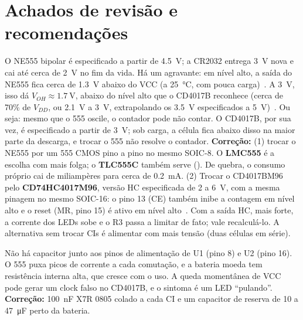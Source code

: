 \documentclass[11pt,a4paper]{article}
\begin{document}
\section{Achados de revisão e recomendações}\label{sec:achados}

\begin{achado}
O NE555 bipolar é especificado a partir de \SI{4,5}{\volt}; a CR2032 entrega
\SI{3}{\volt} nova e cai até cerca de \SI{2}{\volt} no fim da vida. Há um agravante: em
nível alto, a saída do NE555 fica cerca de \SI{1,3}{\volt} abaixo do VCC (a
\SI{25}{\celsius}, com pouca carga)~\cite{ne555}. A \SI{3}{\volt}, isso dá
$V_{OH} \approx \SI{1,7}{\volt}$, abaixo do nível alto que o CD4017B reconhece (cerca de
70\% de $V_{DD}$, ou \SI{2,1}{\volt} a \SI{3}{\volt}, extrapolando os \SI{3,5}{\volt}
especificados a \SI{5}{\volt})~\cite{cd4017}. Ou seja: mesmo que o 555 oscile, o contador
pode não contar. O CD4017B, por sua vez, é especificado a partir de \SI{3}{\volt}; sob
carga, a célula fica abaixo disso na maior parte da descarga, e trocar o 555 não resolve
o contador.
\textbf{Correção:} (1) trocar o NE555 por um 555 CMOS pino a pino no mesmo SOIC-8. O
\textbf{LMC555} é a escolha com mais folga; o \textbf{TLC555C} também serve (\DScmos).
De quebra, o consumo próprio cai de miliampères para cerca de \SI{0,2}{\milli\ampere}.
(2) Trocar o CD4017BM96 pelo \textbf{CD74HC4017M96}, versão HC especificada de 2 a
\SI{6}{\volt}, com a mesma pinagem no mesmo SOIC-16: o pino 13 (CE) também inibe a
contagem em nível alto e o reset (MR, pino 15) é ativo em nível alto~\cite{hc4017}. Com a
saída HC, mais forte, a corrente dos LEDs sobe e o R3 passa a limitar de fato; vale
recalculá-lo. A alternativa sem trocar CIs é alimentar com mais tensão (duas células em
série).
\end{achado}

\begin{achado}
Não há capacitor junto aos pinos de alimentação de U1 (pino 8) e U2 (pino 16). O 555
puxa picos de corrente a cada comutação, e a bateria moeda tem resistência interna
alta, que cresce com o uso. A queda momentânea de VCC pode gerar um clock falso no
CD4017B, e o sintoma é um LED “pulando”. \textbf{Correção:} \SI{100}{\nano\farad} X7R
0805 colado a cada CI e um capacitor de reserva de 10 a \SI{47}{\micro\farad} perto da
bateria.
\end{achado}
\end{document}
